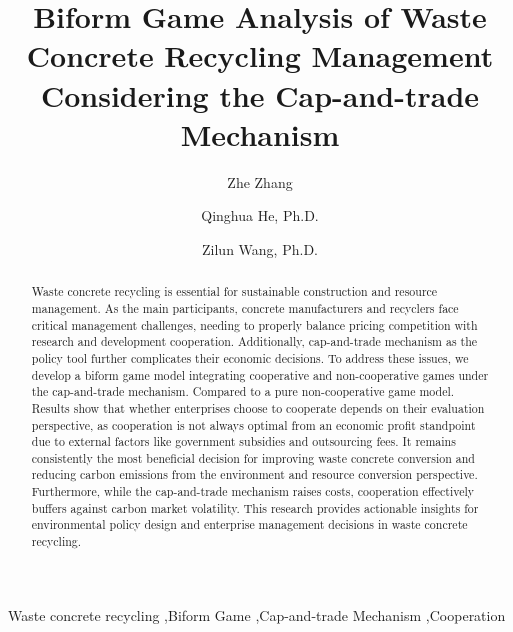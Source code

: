 \documentclass[authoryear,preprint,review,times,10pt]{elsarticle}
\begin{document}
\newtheorem{prop}{Proposition}

\modulolinenumbers[1]
\runninglinenumbers
\begin{frontmatter}

\title{Biform Game Analysis of Waste Concrete Recycling Management Considering the Cap-and-trade Mechanism}

\author[1]{Zhe Zhang}
\author[2]{Qinghua He, Ph.D.}
\author[3]{Zilun Wang, Ph.D.}



\begin{abstract}

Waste concrete recycling is essential for sustainable construction and resource management. As the main participants, concrete manufacturers and recyclers face critical management challenges, needing to properly balance pricing competition with research and development cooperation. Additionally, cap-and-trade mechanism as the policy tool further complicates their economic decisions. To address these issues, we develop a biform game model integrating cooperative and non-cooperative games under the cap-and-trade mechanism. Compared to a pure non-cooperative game model. Results show that whether enterprises choose to cooperate depends on their evaluation perspective, as cooperation is not always optimal from an economic profit standpoint due to external factors like government subsidies and outsourcing fees. It remains consistently the most beneficial decision for improving waste concrete conversion and reducing carbon emissions from the environment and resource conversion perspective. Furthermore, while the cap-and-trade mechanism raises costs, cooperation effectively buffers against carbon market volatility. This research provides actionable insights for environmental policy design and enterprise management decisions in waste concrete recycling.

\end{abstract}

\begin{keyword}
Waste concrete recycling \sep Biform Game \sep Cap-and-trade Mechanism \sep Cooperation
\end{keyword}

\end{frontmatter}
\end{document}

